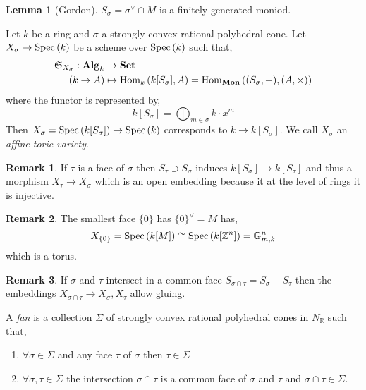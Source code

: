 \documentclass[12pt]{extarticle}
\newcommand{\Z}{\mathbb{Z}}
\newcommand{\R}{\mathbb{R}}
\newcommand{\Set}{\mathbf{Set}}
\theoremstyle{definition}
\newtheorem{lemma}[theorem]{Lemma}
\newtheorem{remark}{Remark}
\newenvironment{definition}[1][Definition:]{\begin{trivlist}
\item[\hskip \labelsep {\bfseries #1}]}{\end{trivlist}}
\begin{document}
\begin{lemma}[Gordon]
$S_\sigma = \sigma^\vee \cap M$ is a finitely-generated moniod. 
\end{lemma}

\begin{definition}
Let $k$ be a ring and $\sigma$ a strongly convex rational polyhedral cone. Let $X_\sigma \to \mathrm{Spec}\left( k \right)$ be a scheme over $\mathrm{Spec}\left( k \right)$ such that,
\begin{align*}
\Sf_{X_\sigma} : \Alg_k & \to \Set
\\
(k \to A) & \mapsto \Homover{k}{k[S_\sigma]}{A} = \Homover{\mathbf{Mon}}{(S_\sigma, +)}{(A, \times)}
\end{align*}
where the functor is represented by,
\[ k[S_\sigma] = \bigoplus_{m \in \sigma} k \cdot x^m \]
Then $X_\sigma = \mathrm{Spec}\left( k[S_\sigma] \right) \to \mathrm{Spec}\left( k \right)$ corresponds to $k \to k[S_\sigma]$. 
We call $X_\sigma$ an \textit{affine toric variety}.
\end{definition}

\begin{remark}
If $\tau$ is a face of $\sigma$ then $S_\tau \supset S_\sigma$ induces $k[S_\sigma] \to k[S_\tau]$ and thus a morphism $X_\tau \to X_\sigma$ which is an open embedding because it at the level of rings it is injective. 
\end{remark}

\begin{remark}
The smallest face $\{ 0 \}$ has $\{ 0 \}^\vee = M$ has,
\[ X_{\{0\}} = \Spec{k[M]} \cong \Spec{k[\Z^n]} = \mathbb{G}_{m,k}^n \]
which is a torus. 
\end{remark}

\begin{remark}
If $\sigma$ and $\tau$ intersect in a common face $S_{\sigma \cap \tau} = S_\sigma + S_\tau$ then the embeddings $X_{\sigma \cap \tau} \to X_{\sigma}, X_{\tau}$ allow gluing. 
\end{remark}

\begin{definition}
A \textit{fan} is a collection $\Sigma$ of strongly convex rational polyhedral cones in $N_\R$ such that,
\begin{enumerate}
\item $\forall \sigma \in \Sigma$ and any face $\tau$ of $\sigma$ then $\tau \in \Sigma$

\item $\forall \sigma, \tau \in \Sigma$ the intersection $\sigma \cap \tau$ is a common face of $\sigma$ and $\tau$ and $\sigma \cap \tau \in \Sigma$.
\end{enumerate}
\end{definition}
\end{document}
